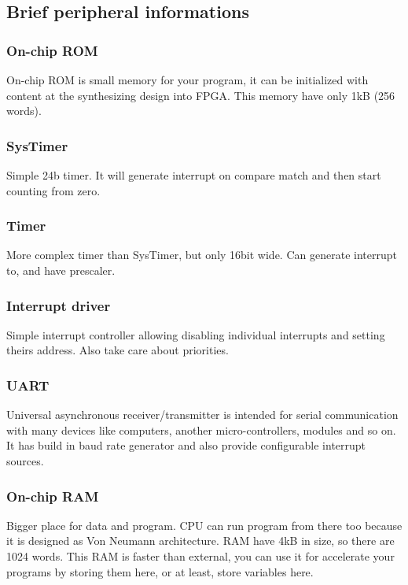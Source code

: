 \subsection{Brief peripheral informations}

\subsubsection{On-chip ROM}

On-chip ROM is small memory for your program, it can be initialized with content
 at the synthesizing design into FPGA. This memory have only 1kB (256 words).

\subsubsection{SysTimer}

Simple 24b timer. It will generate interrupt on compare match and then start
counting from zero.

\subsubsection{Timer}

More complex timer than SysTimer, but only 16bit wide. Can generate 
interrupt to, and have prescaler.

\subsubsection{Interrupt driver}

Simple interrupt controller allowing disabling individual interrupts and
setting theirs address. Also take care about priorities.

\subsubsection{UART}

Universal asynchronous receiver/transmitter is intended for serial communication
with many devices like computers, another micro-controllers, modules and so on.
It has build in baud rate generator and also provide configurable interrupt sources.

\subsubsection{On-chip RAM}

Bigger place for data and program. CPU can run program from there too because
it is designed as Von Neumann architecture. RAM have 4kB in size, so there are
1024 words. This RAM is faster than external, you can use it for accelerate your
programs by storing them here, or at least, store variables here.

